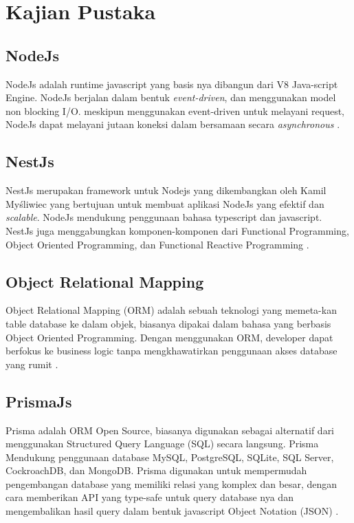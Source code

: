\chapter{Kajian Pustaka}
 
\section{NodeJs}
NodeJs adalah runtime javascript yang basis nya dibangun dari V8 Java-script Engine. NodeJs berjalan dalam bentuk \textit{event-driven}, dan menggunakan model non blocking I/O. meskipun menggunakan event-driven untuk melayani request, NodeJs dapat melayani jutaan koneksi dalam bersamaan secara \textit{asynchronous} \cite{shah2017node}.

\section{NestJs}
NestJs merupakan framework untuk Nodejs yang dikembangkan oleh Kamil Myśliwiec yang bertujuan untuk membuat aplikasi NodeJs yang efektif dan \textit{scalable}. NodeJs mendukung penggunaan bahasa typescript dan javascript. NestJs juga menggabungkan komponen-komponen dari Functional Programming, Object Oriented Programming, dan Functional Reactive Programming \cite{pham2020developing} \cite{NestJS}.

\section{Object Relational Mapping}
Object Relational Mapping (ORM) adalah sebuah teknologi yang memeta-kan table database ke dalam objek, biasanya dipakai dalam bahasa yang berbasis Object Oriented Programming. Dengan menggunakan ORM, developer dapat berfokus ke business logic tanpa mengkhawatirkan penggunaan akses database yang rumit \cite{lorenz2017object}. 

\section{PrismaJs}
Prisma adalah ORM Open Source, biasanya digunakan sebagai alternatif dari menggunakan Structured Query Language (SQL) secara langsung. Prisma Mendukung penggunaan database MySQL, PostgreSQL, SQLite, SQL Server, CockroachDB, dan MongoDB. Prisma digunakan untuk mempermudah pengembangan database yang memiliki relasi yang komplex dan besar, dengan cara memberikan API yang type-safe untuk query database nya dan mengembalikan hasil query dalam bentuk javascript Object Notation (JSON) \cite{Prisma}.

